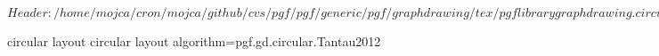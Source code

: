 %
%
%

\ProvidesFileRCS[v\pgfversion] $Header: /home/mojca/cron/mojca/github/cvs/pgf/pgf/generic/pgf/graphdrawing/tex/pgflibrarygraphdrawing.circular.code.tex,v 1.3 2012/05/06 21:45:47 tantau Exp $





%
%
\pgfgddeclarealgorithmkey
  {circular layout}
  {circular layout}
  {algorithm=pgf.gd.circular.Tantau2012}



\endinput